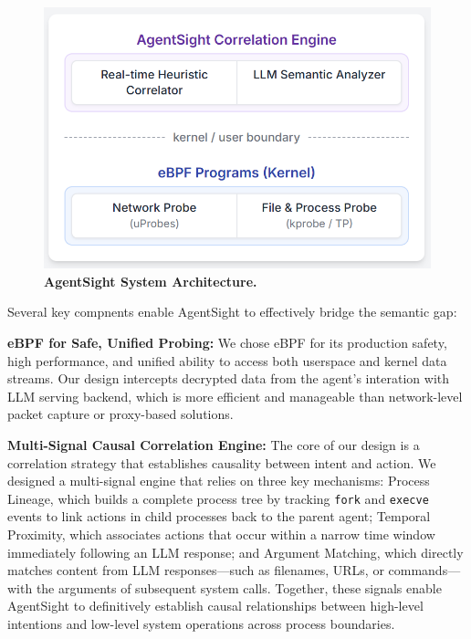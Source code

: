 \begin{figure}[h!]
    \centering
    \includegraphics[width=\columnwidth]{figture/arch.png} %
    \caption{\textbf{AgentSight System Architecture.}}
    \label{fig:architecture}
\end{figure}

Several key compnents enable AgentSight to effectively bridge the semantic gap:

\textbf{eBPF for Safe, Unified Probing:} We chose eBPF for its production safety, high performance, and unified ability to access both userspace and kernel data streams. Our design intercepts decrypted data from the agent's interation with LLM serving backend, which is more efficient and manageable than network-level packet capture or proxy-based solutions.

\textbf{Multi-Signal Causal Correlation Engine:} The core of our design is a correlation strategy that establishes causality between intent and action. We designed a multi-signal engine that relies on three key mechanisms: Process Lineage, which builds a complete process tree by tracking \texttt{fork} and \texttt{execve} events to link actions in child processes back to the parent agent; Temporal Proximity, which associates actions that occur within a narrow time window immediately following an LLM response; and Argument Matching, which directly matches content from LLM responses—such as filenames, URLs, or commands—with the arguments of subsequent system calls. Together, these signals enable AgentSight to definitively establish causal relationships between high-level intentions and low-level system operations across process boundaries.

